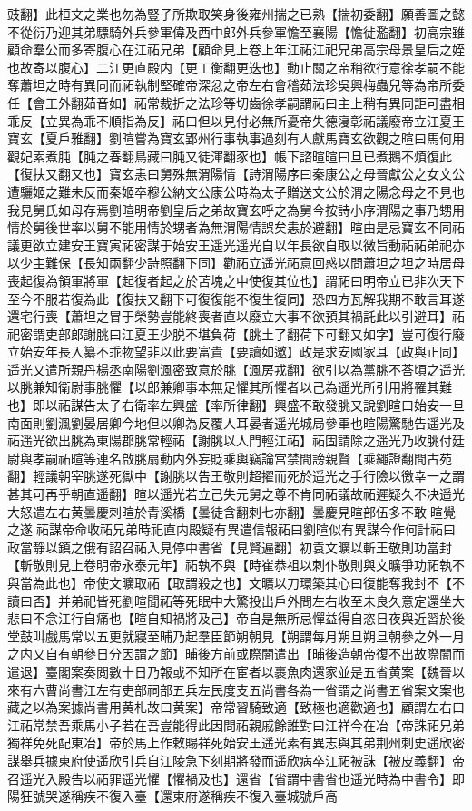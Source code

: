豉翻】此桓文之業也勿為豎子所欺取笑身後雍州揣之已熟【揣初委翻】願善圖之懿不從衍乃迎其弟驃騎外兵參軍偉及西中郎外兵參軍憺至襄陽【憺徙濫翻】初高宗雖顧命羣公而多寄腹心在江祏兄弟【顧命見上卷上年江祏江祀兄弟高宗母景皇后之姪也故寄以腹心】二江更直殿内【更工衡翻更迭也】動止關之帝稍欲行意徐孝嗣不能奪蕭坦之時有異同而祏執制堅確帝深忿之帝左右會稽茹法珍吳興梅蟲兒等為帝所委任【會工外翻茹音如】祏常裁折之法珍等切齒徐孝嗣謂祏曰主上稍有異同詎可盡相乖反【立異為乖不順指為反】祏曰但以見付必無所憂帝失德寖彰祏議廢帝立江夏王寶玄【夏戶雅翻】劉暄嘗為寶玄郢州行事執事過刻有人獻馬寶玄欲觀之暄曰馬何用觀妃索煮肫【肫之春翻鳥藏曰肫又徒渾翻豕也】帳下諮暄暄曰旦已煮鵝不煩復此【復扶又翻又也】寶玄恚曰舅殊無渭陽情【詩渭陽序曰秦康公之母晉獻公之女文公遭驪姬之難未反而秦姬卒穆公納文公康公時為太子贈送文公於渭之陽念母之不見也我見舅氏如母存焉劉暄明帝劉皇后之弟故寶玄呼之為舅今按詩小序渭陽之事乃甥用情於舅後世率以舅不能用情於甥者為無渭陽情誤矣恚於避翻】暄由是忌寶玄不同祏議更欲立建安王寶寅祏密謀于始安王遥光遥光自以年長欲自取以微旨動祏祏弟祀亦以少主難保【長知兩翻少詩照翻下同】勸祏立遥光祏意回惑以問蕭坦之坦之時居母喪起復為領軍將軍【起復者起之於苫塊之中使復其位也】謂祏曰明帝立已非次天下至今不服若復為此【復扶又翻下可復復能不復生復同】恐四方瓦解我期不敢言耳遂還宅行喪【蕭坦之冒于榮勢豈能終喪者直以廢立大事不欲預其禍託此以引避耳】祏祀密謂吏部郎謝朓曰江夏王少脱不堪負荷【朓土了翻荷下可翻又如字】豈可復行廢立始安年長入纂不乖物望非以此要富貴【要讀如邀】政是求安國家耳【政與正同】遥光又遣所親丹楊丞南陽劉渢密致意於朓【渢房戎翻】欲引以為黨朓不荅頃之遥光以脁兼知衛尉事脁懼【以郎兼卿事本無足懼其所懼者以己為遥光所引用將罹其難也】即以祏謀告太子右衛率左興盛【率所律翻】興盛不敢發朓又說劉暄曰始安一旦南面則劉渢劉晏居卿今地但以卿為反覆人耳晏者遥光城局參軍也暄陽驚馳告遥光及祏遥光欲出脁為東陽郡脁常輕祏【謝朓以人門輕江祏】祏固請除之遥光乃收朓付廷尉與孝嗣祏暄等連名啟朓扇動内外妄貶乘輿竊論宫禁間謗親賢【乘繩證翻間古苑翻】輕議朝宰朓遂死獄中【謝朓以告王敬則超擢而死於遥光之手行險以徼幸一之謂甚其可再乎朝直遥翻】暄以遥光若立己失元舅之尊不肯同祏議故祏遲疑久不决遥光大怒遣左右黄曇慶刺暄於青溪橋【曇徒含翻刺七亦翻】曇慶見暄部伍多不敢暄覺之遂祏謀帝命收祏兄弟時祀直内殿疑有異遣信報祏曰劉暄似有異謀今作何計祏曰政當靜以鎮之俄有詔召祏入見停中書省【見賢遍翻】初袁文曠以斬王敬則功當封【斬敬則見上卷明帝永泰元年】祏執不與【時崔恭祖以刺仆敬則與文曠爭功祏執不與當為此也】帝使文曠取祏【取謂殺之也】文曠以刀環築其心曰復能奪我封不【不讀曰否】并弟祀皆死劉暄聞祏等死眠中大驚投出戶外問左右收至未良久意定還坐大悲曰不念江行自痛也【暄自知禍將及己】帝自是無所忌憚益得自恣日夜與近習於後堂鼓叫戲馬常以五更就寢至晡乃起羣臣節朔朝見【朔謂每月朔旦朔旦朝參之外一月之内又自有朝參日分因謂之節】晡後方前或際闇遣出【晡後造朝帝復不出故際闇而遣退】臺閣案奏閲數十日乃報或不知所在宦者以裹魚肉還家並是五省黄案【魏晉以來有六曹尚書江左有吏部祠部五兵左民度支五尚書各為一省謂之尚書五省案文案也藏之以為案據尚書用黄札故曰黄案】帝常習騎致適【致極也適歡適也】顧謂左右曰江祏常禁吾乘馬小子若在吾豈能得此因問祏親戚餘誰對曰江祥今在冶【帝誅祏兄弟獨祥免死配東冶】帝於馬上作敕賜祥死始安王遥光素有異志與其弟荆州刺史遥欣密謀舉兵據東府使遥欣引兵自江陵急下刻期將發而遥欣病卒江祏被誅【被皮義翻】帝召遥光入殿告以祏罪遥光懼【懼禍及也】還省【省謂中書省也遥光時為中書令】即陽狂號哭遂稱疾不復入臺【還東府遂稱疾不復入臺城號戶高